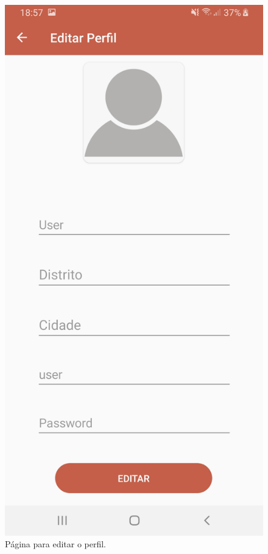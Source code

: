 \begin{figure}[H]
\centering
\includegraphics[width=0.5\linewidth]{images/editarPerfil.jpg}
\caption{Página para editar o perfil.}
\end{figure}